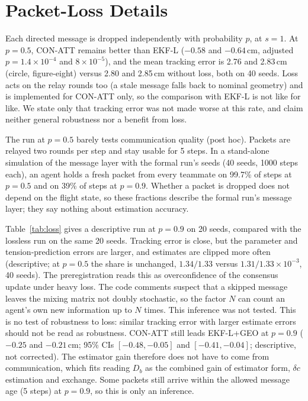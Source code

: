 \documentclass[conference]{IEEEtran}
\begin{document}
\section{Packet-Loss Details}\label{app:loss}
Each directed message is dropped independently with probability $p$, at $s{=}1$. At $p=0.5$, CON-ATT remains better than EKF-L ($-0.58$ and $-0.64$\,cm, adjusted $p=1.4\times10^{-4}$ and $8\times10^{-5}$), and the mean tracking error is 2.76 and 2.83\,cm (circle, figure-eight) versus 2.80 and 2.85\,cm without loss, both on 40 seeds. Loss acts on the relay rounds too (a stale message falls back to nominal geometry) and is implemented for CON-ATT only, so the comparison with EKF-L is not like for like. We state only that tracking error was not made worse at this rate, and claim neither general robustness nor a benefit from loss.

The run at $p=0.5$ barely tests communication quality (post hoc). Packets are relayed two rounds per step and stay usable for 5 steps. In a stand-alone simulation of the message layer with the formal run's seeds (40 seeds, 1000 steps each), an agent holds a fresh packet from every teammate on 99.7\% of steps at $p=0.5$ and on 39\% of steps at $p=0.9$. Whether a packet is dropped does not depend on the flight state, so these fractions describe the formal run's message layer; they say nothing about estimation accuracy.

Table~\ref{tab:loss} gives a descriptive run at $p=0.9$ on 20 seeds, compared with the lossless run on the same 20 seeds. Tracking error is close, but the parameter and tension-prediction errors are larger, and estimates are clipped more often (descriptive; at $p=0.5$ the share is unchanged, $1.34/1.33$ versus $1.31/1.33\times10^{-3}$, 40 seeds). The preregistration reads this as overconfidence of the consensus update under heavy loss. The code comments suspect that a skipped message leaves the mixing matrix not doubly stochastic, so the factor $N$ can count an agent's own new information up to $N$ times. This inference was not tested. This is no test of robustness to loss: similar tracking error with larger estimate errors should not be read as robustness. CON-ATT still leads EKF-L+GEO at $p=0.9$ ($-0.25$ and $-0.21$\,cm; 95\% CIs $[-0.48,-0.05]$ and $[-0.41,-0.04]$; descriptive, not corrected). The estimator gain therefore does not have to come from communication, which fits reading $D_b$ as the combined gain of estimator form, $\delta c$ estimation and exchange. Some packets still arrive within the allowed message age (5 steps) at $p=0.9$, so this is only an inference.
\end{document}
